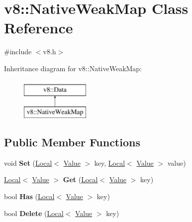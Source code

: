 \hypertarget{classv8_1_1NativeWeakMap}{}\section{v8\+:\+:Native\+Weak\+Map Class Reference}
\label{classv8_1_1NativeWeakMap}


{\ttfamily \#include $<$v8.\+h$>$}

Inheritance diagram for v8\+:\+:Native\+Weak\+Map\+:\begin{figure}[H]
\begin{center}
\leavevmode
\includegraphics[height=2.000000cm]{classv8_1_1NativeWeakMap}
\end{center}
\end{figure}
\subsection*{Public Member Functions}
\begin{DoxyCompactItemize}
\item 
\hypertarget{classv8_1_1NativeWeakMap_ade0e4ce74820a0fcf8b51fb1cea733a7}{}void {\bfseries Set} (\hyperlink{classv8_1_1Local}{Local}$<$ \hyperlink{classv8_1_1Value}{Value} $>$ key, \hyperlink{classv8_1_1Local}{Local}$<$ \hyperlink{classv8_1_1Value}{Value} $>$ value)\label{classv8_1_1NativeWeakMap_ade0e4ce74820a0fcf8b51fb1cea733a7}

\item 
\hypertarget{classv8_1_1NativeWeakMap_a9350148caa6f09f7c228dda255317387}{}\hyperlink{classv8_1_1Local}{Local}$<$ \hyperlink{classv8_1_1Value}{Value} $>$ {\bfseries Get} (\hyperlink{classv8_1_1Local}{Local}$<$ \hyperlink{classv8_1_1Value}{Value} $>$ key)\label{classv8_1_1NativeWeakMap_a9350148caa6f09f7c228dda255317387}

\item 
\hypertarget{classv8_1_1NativeWeakMap_a9de62c6399280088c86bb57c3988e7cb}{}bool {\bfseries Has} (\hyperlink{classv8_1_1Local}{Local}$<$ \hyperlink{classv8_1_1Value}{Value} $>$ key)\label{classv8_1_1NativeWeakMap_a9de62c6399280088c86bb57c3988e7cb}

\item 
\hypertarget{classv8_1_1NativeWeakMap_ae3c04eaa9e745732f7b2f16c6e75dead}{}bool {\bfseries Delete} (\hyperlink{classv8_1_1Local}{Local}$<$ \hyperlink{classv8_1_1Value}{Value} $>$ key)\label{classv8_1_1NativeWeakMap_ae3c04eaa9e745732f7b2f16c6e75dead}

\end{DoxyCompactItemize}
